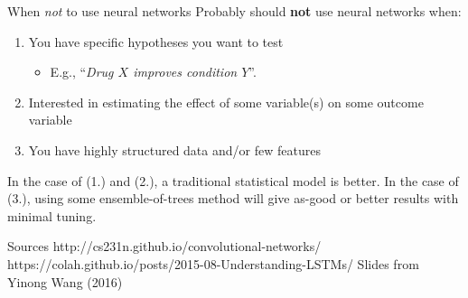 \documentclass[pdf]{beamer}
\begin{document}
	\begin{frame}{When \textit{not} to use neural networks}
		Probably should \textbf{not} use neural networks when:
		\vspace{1em}
		\begin{enumerate}
			\item You have specific hypotheses you want to test
				\begin{itemize}
					\item E.g., ``\textit{Drug $X$ improves condition $Y$}''.
				\end{itemize}
			\item Interested in estimating the effect of some variable(s) on some outcome variable
			\item You have highly structured data and/or few features
		\end{enumerate}
		
		\vspace{2em}
		
		In the case of (1.) and (2.), a traditional statistical model is better. In the case of (3.), using some ensemble-of-trees method will give as-good or better results with minimal tuning.
	\end{frame}

	\begin{frame}{Sources}
	http://cs231n.github.io/convolutional-networks/
	https://colah.github.io/posts/2015-08-Understanding-LSTMs/
	Slides from Yinong Wang (2016)
	
	\end{frame}
\end{document}
